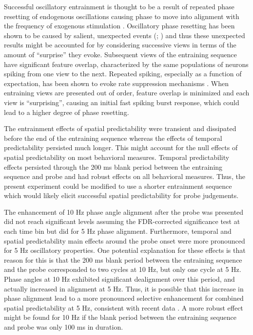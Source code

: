 \documentclass[dwyatte_dissertation.tex]{subfiles}
\begin{document}
Successful oscillatory entrainment is thought to be a result of repeated phase resetting of endogenous oscillations causing phase to move into alignment with the frequency of exogenous stimulation \cite{SchroederLakatosKajikawaEtAl08,CalderoneLakatosButlerEtAlInPress}. Oscillatory phase resetting has been shown to be caused by salient, unexpected events (; ) and thus these unexpected results might be accounted for by considering successive views in terms of the amount of ``surprise'' \cite{IttiBaldi09,MeyerOlson11} they evoke. Subsequent views of the entraining sequence have significant feature overlap, characterized by the same populations of neurons spiking from one view to the next. Repeated spiking, especially as a function of expectation, has been shown to evoke rate suppression mechanisms \cite{SummerfieldTrittschuhMontiEtAl08}. When entraining views are presented out of order, feature overlap is minimized and each view is ``surprising'', causing an initial fast spiking burst response, which could lead to a higher degree of phase resetting.


The entrainment effects of spatial predictability were transient and dissipated before the end of the entraining sequence whereas the effects of temporal predictability persisted much longer. This might account for the null effects of spatial predictability on most behavioral measures. Temporal predictability effects persisted through the 200 ms blank period between the entraining sequence and probe and had robust effects on all behavioral measures. Thus, the present experiment could be modified to use a shorter entrainment sequence which would likely elicit successful spatial predictability for probe judgements.

The enhancement of 10 Hz phase angle alignment after the probe was presented did not reach significant levels assuming the FDR-corrected significance test at each time bin but did for 5 Hz phase alignment. Furthermore, temporal and spatial predictability main effects around the probe onset were more pronounced for 5 Hz oscillatory properties. One potential explanation for these effects is that reason for this is that the 200 ms blank period between the entraining sequence and the probe corresponded to two cycles at 10 Hz, but only one cycle at 5 Hz. Phase angles at 10 Hz exhibited significant dealignment over this period, and actually increased in alignment at 5 Hz. Thus, it is possible that this increase in phase alignment lead to a more pronounced selective enhancement for combined spatial predictability at 5 Hz, consistent with recent data \cite{CravoRohenkohlWyartEtAl13}. A more robust effect might be found for 10 Hz if the blank period between the entraining sequence and probe was only 100 ms in duration.
\end{document}
